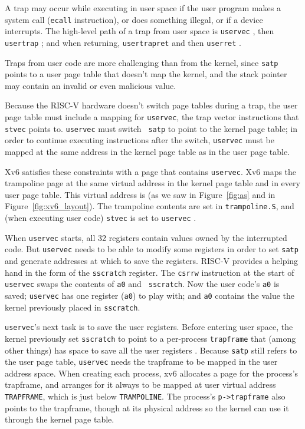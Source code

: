 A trap may occur while executing in user space if the
user program makes a
system call ({\tt ecall} instruction), or does something
illegal, or if a device interrupts.
The high-level path of a trap from user space is
{\tt uservec}
,
then {\tt usertrap}
;
and when returning,
{\tt usertrapret}
and then
{\tt userret}
.

Traps from user code are more challenging than from the kernel, since
{\tt satp} points to a user page table that doesn't map the 
kernel, and the stack pointer may contain an invalid or even malicious
value.

Because the RISC-V hardware doesn't switch page tables during a trap,
the user page table must include a mapping for {\tt uservec},
the trap vector
instructions that {\tt stvec} points to. {\tt uservec}
must switch {\tt
  satp} to point to the kernel page table;
in order to continue executing instructions after the switch,
{\tt uservec} must be mapped at the same address in the
kernel page table as in the user page table.

Xv6 satisfies these constraints with a  page
that contains {\tt uservec}. Xv6 maps the trampoline page at
the same virtual address in the kernel page table and in every user
page table. This virtual address is  (as we saw
in Figure~\ref{fig:as} and in Figure~\ref{fig:xv6_layout}). The
trampoline contents are set in {\tt trampoline.S},
and (when executing user code) {\tt stvec} is set to
{\tt uservec}
.

When {\tt uservec} starts, all 32 registers contain values owned by
the interrupted code. But {\tt uservec} needs to be able to modify
some registers in order to set {\tt satp} and generate addresses at
which to save the registers. RISC-V provides a helping hand in the
form of the {\tt sscratch} register. The {\tt csrrw} instruction at
the start of {\tt uservec} swaps the contents of {\tt a0} and {\tt
  sscratch}. Now the user code's {\tt a0} is saved; {\tt uservec} has
one register ({\tt a0}) to play with; and {\tt a0} contains the
value the kernel previously placed in {\tt sscratch}.

{\tt uservec}'s next task is to save the user registers. Before
entering user space, the kernel previously set {\tt sscratch} to point to a
per-process {\tt trapframe} that (among other things) has space to
save all the user registers
. Because {\tt satp} still
refers to the user page table, {\tt uservec} needs the trapframe to be
mapped in the user address space. When creating each process, xv6
allocates a page for the process's trapframe, and arranges for it
always to be mapped at user virtual address {\tt TRAPFRAME}, which is
just below {\tt TRAMPOLINE}. The process's {\tt p->trapframe} also
points to the
trapframe, though at its physical address so the kernel can use it
through the kernel page table.

